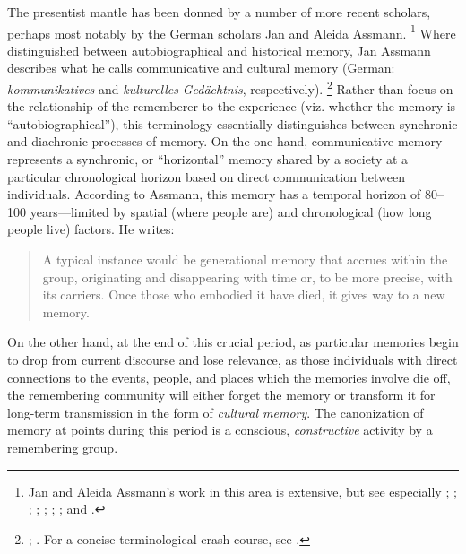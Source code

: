 The presentist mantle has been donned by a number of more recent scholars, perhaps most notably by the German scholars Jan and Aleida Assmann.%
    \footnote{%
        Jan and Aleida Assmann's work in this area is extensive, but see especially 
        \cite{a_assmann_poltermann1995}; 
        \cite{a_assmann2011};
        \cite{assmann_nikulin2015}; 
        \cite{assmann2014};
        \cite{assmann2011};
        \cite{assmann_erllnunning2008};
        \cite{assmann2006}; and
        \cite{assmannassmann_merten-etal1994}.}
Where \halbwachs distinguished between autobiographical and historical memory, Jan Assmann describes what he calls communicative and cultural memory (German: \emph{kommunikatives} and \emph{kulturelles} \emph{Gedächtnis}, respectively).%
    \footnote{%
        \Cite[36]{assmann2011};
        \cite{assmann_erllnunning2008}.
        For a concise terminological crash-course, see
        \cite[182--183]{hubenthal_carstens-hasselbalch2012}.}
Rather than focus on the relationship of the rememberer to the experience (viz. whether the memory is ``autobiographical''), this terminology essentially distinguishes between synchronic and diachronic processes of memory. On the one hand, communicative memory represents a synchronic, or ``horizontal'' memory shared by a society at a particular chronological horizon based on direct communication between individuals. According to Assmann, this memory has a temporal horizon of 80--100 years---limited by spatial (where people are) and chronological (how long people live) factors. He writes:  

\begin{quote}
    A typical instance would be generational memory that accrues within the group, originating and disappearing with time or, to be more precise, with its carriers. Once those who embodied it have died, it gives way to a new memory.%
        \autocite[36]{assmann2011} 
\end{quote}  
\noindent
On the other hand, at the end of this crucial period, as particular memories begin to drop from current discourse and lose relevance, as those individuals with direct connections to the events, people, and places which the memories involve die off, the remembering community will either forget the memory or transform it for long-term transmission in the form of \emph{cultural memory}. The canonization of memory at points during this period is a conscious, \emph{constructive} activity by a remembering group.%
    \autocite[45]{assmann2011}  

